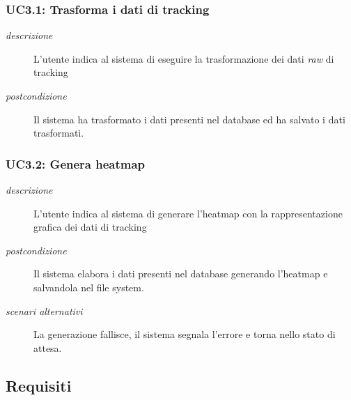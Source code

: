 \subsubsection{UC3.1: Trasforma i dati di tracking}
\begin{description}
 \item[\em{descrizione}] L'utente indica al sistema di eseguire la trasformazione dei dati \textit{raw} di tracking
  \item[\em{postcondizione}] Il sistema ha trasformato i dati presenti nel database ed ha salvato i dati trasformati.
  \end{description}
  
\subsubsection{UC3.2: Genera heatmap}
\begin{description}
 \item[\em{descrizione}] L'utente indica al sistema di generare l'heatmap con la rappresentazione grafica dei dati di tracking
  \item[\em{postcondizione}] Il sistema elabora i dati presenti nel database generando l'heatmap e salvandola nel file system.
  \item[\em{scenari alternativi}] La generazione fallisce, il sistema segnala l'errore e torna nello stato di attesa.
  \end{description}
  
\subsection{Requisiti}
